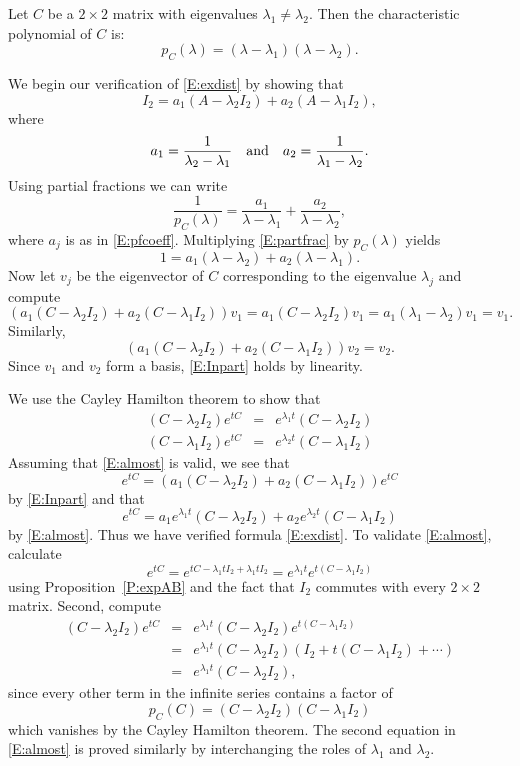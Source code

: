 \documentclass{ximera}
\begin{document}
Let $C$ be a $2\times 2$ matrix with eigenvalues $\lambda_1\neq\lambda_2$.
Then the characteristic polynomial of $C$ is:
\[
p_C(\lambda) = (\lambda-\lambda_1)(\lambda-\lambda_2).
\]

We begin our verification of \eqref{E:exdist} by showing that
\begin{equation}  \label{E:Inpart}
I_2 = a_1 (A - \lambda_2I_2) + a_2 (A - \lambda_1I_2),
\end{equation}
where
\begin{equation}  \label{E:pfcoeff}
a_1 = \frac{1}{\lambda_2-\lambda_1} \quad\mbox{and}\quad a_2 = \frac{1}{\lambda_1-\lambda_2}.
\end{equation}
Using partial fractions we can write
\begin{equation}  \label{E:partfrac}
\frac{1}{p_C(\lambda)} = \frac{a_1}{\lambda-\lambda_1} +
\frac{a_2}{\lambda-\lambda_2},
\end{equation}
where $a_j$ is as in \eqref{E:pfcoeff}.
Multiplying \eqref{E:partfrac} by $p_C(\lambda)$ yields
\[
1 = a_1 (\lambda-\lambda_2) + a_2 (\lambda-\lambda_1).
\]
Now let $v_j$ be the eigenvector of $C$ corresponding to the eigenvalue
$\lambda_j$ and compute
\[
(a_1 (C - \lambda_2I_2) + a_2 (C - \lambda_1I_2))v_1 =
a_1(C - \lambda_2I_2)v_1 = a_1(\lambda_1-\lambda_2)v_1 = v_1.
\]
Similarly,
\[
(a_1 (C - \lambda_2I_2) + a_2 (C - \lambda_1I_2))v_2 = v_2.
\]
Since $v_1$ and $v_2$ form a basis, \eqref{E:Inpart} holds by linearity.

We use the Cayley Hamilton theorem to show that
\begin{equation}  \label{E:almost}
\begin{array}{rcl}
(C - \lambda_2I_2)e^{tC} & = & e^{\lambda_1 t}(C - \lambda_2I_2)\\
(C - \lambda_1I_2)e^{tC} & = & e^{\lambda_2 t}(C - \lambda_1I_2)
\end{array}
\end{equation}
Assuming that \eqref{E:almost} is valid, we see that
\[
e^{tC} = (a_1 (C - \lambda_2I_2) + a_2 (C - \lambda_1I_2))e^{tC}
\]
by \eqref{E:Inpart} and that
\[
e^{tC} = a_1 e^{\lambda_1 t}(C - \lambda_2I_2) +
a_2 e^{\lambda_2 t}(C - \lambda_1I_2)
\]
by \eqref{E:almost}.  Thus we have verified formula \eqref{E:exdist}.
To validate \eqref{E:almost}, calculate
\[
e^{tC} = e^{tC - \lambda_1 tI_2 + \lambda_1 tI_2} =
e^{\lambda_1t}e^{t(C - \lambda_1 I_2)}
\]
using Proposition~\ref{P:expAB} and the fact that $I_2$ commutes with every
$2\times 2$ matrix.  Second, compute
\begin{eqnarray*}
(C - \lambda_2I_2)e^{tC} & = &
e^{\lambda_1 t}(C - \lambda_2I_2)e^{t(C - \lambda_1 I_2)} \\
& = &  e^{\lambda_1 t}(C - \lambda_2I_2)(I_2 + t(C - \lambda_1 I_2) + \cdots)\\
& = & e^{\lambda_1 t}(C - \lambda_2I_2),
\end{eqnarray*}
since every other term in the infinite series contains a factor of
\[
p_C(C) = (C - \lambda_2I_2)(C - \lambda_1 I_2)
\]
which vanishes by the Cayley Hamilton theorem.  The second equation in
\eqref{E:almost} is proved similarly by interchanging the roles of $\lambda_1$
and $\lambda_2$.
\end{document}

